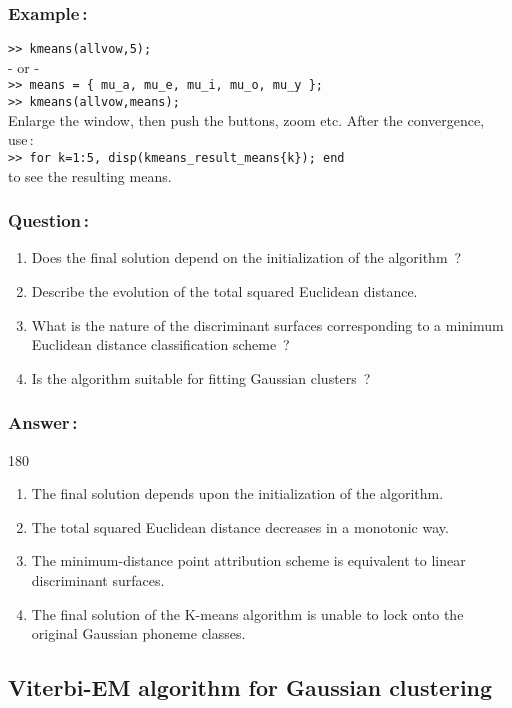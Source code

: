 \documentclass[twoside,a4paper,titlepage]{article}
\newcommand{\mat}[1]{{\tt >> #1} \\}
\newcommand{\expl}[1]{%
\begin{turn}{180}%
\parbox{\textwidth}{\em #1}%
\end{turn}%
}
\begin{document}
\subsubsection*{Example\,:}
\mat{kmeans(allvow,5);}
- or - \\
\mat{means =  \{ mu\_a, mu\_e, mu\_i, mu\_o, mu\_y \};}
\mat{kmeans(allvow,means);}
Enlarge the window, then push the buttons, zoom etc.
After the convergence, use\,:\\
\mat{for k=1:5, disp(kmeans\_result\_means\{k\}); end}
to see the resulting means.


\subsubsection*{Question\,:}
\begin{enumerate}
\item Does the final solution depend on the initialization of the
algorithm~?
\item Describe the evolution of the total squared Euclidean distance.
\item What is the nature of the discriminant surfaces corresponding to a
minimum Euclidean distance classification scheme~?
\item Is the algorithm suitable for fitting Gaussian clusters~?
\end{enumerate}


\subsubsection*{Answer\,:}
\expl{
\begin{enumerate}
\item The final solution depends upon the initialization of the
algorithm.
\item The total squared Euclidean distance decreases in a monotonic way.
\item The minimum-distance point attribution scheme is equivalent to linear
discriminant surfaces.
\item The final solution of the K-means algorithm is unable to lock
onto the original Gaussian phoneme classes.
\end{enumerate}
}


\subsection{Viterbi-EM algorithm for Gaussian clustering}
\end{document}
